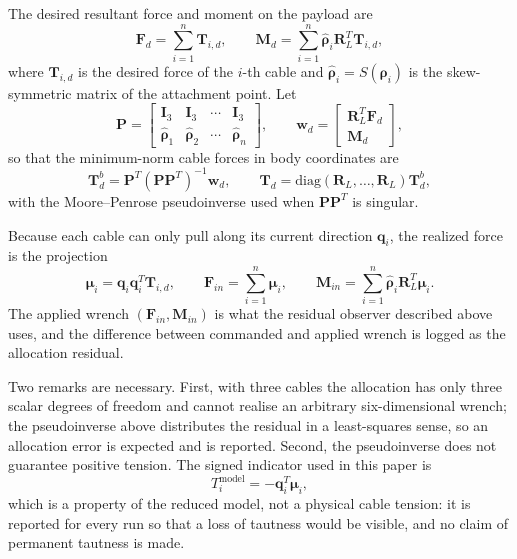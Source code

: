 \documentclass[Review,sageh,times]{sagej}
\begin{document}
The desired resultant force and moment on the payload are
\begin{equation}
\mathbf{F}_d = \sum_{i=1}^{n}\mathbf{T}_{i,d},
\qquad
\mathbf{M}_d = \sum_{i=1}^{n}\hat{\boldsymbol{\rho}}_i\mathbf{R}_L^{T}\mathbf{T}_{i,d},
\label{eq:FdMd}
\end{equation}
where $\mathbf{T}_{i,d}$ is the desired force of the $i$-th cable and
$\hat{\boldsymbol{\rho}}_i=S(\boldsymbol{\rho}_i)$ is the skew-symmetric matrix of the
attachment point. Let
\begin{equation}
\mathbf{P} =
\begin{bmatrix}
\mathbf{I}_3 & \mathbf{I}_3 & \cdots & \mathbf{I}_3\\
\hat{\boldsymbol{\rho}}_1 & \hat{\boldsymbol{\rho}}_2 & \cdots & \hat{\boldsymbol{\rho}}_n
\end{bmatrix},
\qquad
\mathbf{w}_d =
\begin{bmatrix}
\mathbf{R}_L^{T}\mathbf{F}_d\\ \mathbf{M}_d
\end{bmatrix},
\label{eq:configmat}
\end{equation}
so that the minimum-norm cable forces in body coordinates are
\begin{equation}
\mathbf{T}_d^{b} = \mathbf{P}^{T}\left(\mathbf{P}\mathbf{P}^{T}\right)^{-1}\mathbf{w}_d,
\qquad
\mathbf{T}_d = \mathrm{diag}\left(\mathbf{R}_L,\ldots,\mathbf{R}_L\right)\mathbf{T}_d^{b},
\label{eq:minnorm}
\end{equation}
with the Moore--Penrose pseudoinverse used when $\mathbf{P}\mathbf{P}^{T}$ is singular.

Because each cable can only pull along its current direction $\mathbf{q}_i$, the
realized force is the projection
\begin{equation}
\boldsymbol{\mu}_i = \mathbf{q}_i\mathbf{q}_i^{T}\mathbf{T}_{i,d},
\qquad
\mathbf{F}_{in} = \sum_{i=1}^{n}\boldsymbol{\mu}_i,
\qquad
\mathbf{M}_{in} = \sum_{i=1}^{n}\hat{\boldsymbol{\rho}}_i\mathbf{R}_L^{T}\boldsymbol{\mu}_i .
\label{eq:proj}
\end{equation}
The applied wrench $(\mathbf{F}_{in},\mathbf{M}_{in})$ is what the residual observer
described above uses, and the difference between commanded and applied
wrench is logged as the allocation residual.

Two remarks are necessary. First, with three cables the allocation has
only three scalar degrees of freedom and cannot realise an arbitrary
six-dimensional wrench; the pseudoinverse above distributes the residual in a
least-squares sense, so an allocation error is expected and is reported.
Second, the pseudoinverse does not guarantee positive tension. The signed
indicator used in this paper is
\begin{equation}
T_i^{\mathrm{model}} = -\mathbf{q}_i^{T}\boldsymbol{\mu}_i ,
\label{eq:signedtension}
\end{equation}
which is a property of the reduced model, not a physical cable tension: it is
reported for every run so that a loss of tautness would be visible, and no
claim of permanent tautness is made.
\end{document}
